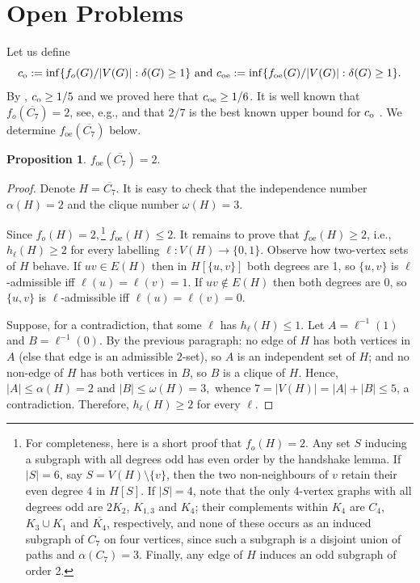 \documentclass[11pt]{article}
\newcommand{\GG}[1]{{#1}}
\newcommand{\VV}[1]{{#1}}
\newtheorem{proposition}[theorem]{Proposition}
\theoremstyle{definition}
\theoremstyle{remark}
\newcommand{\foe}{f_{\mathrm{oe}}}
\newcommand{\fo}{f_o}
\newcommand{\1}{\mathbf{1}}
\begin{document}
\section{Open Problems}
\GG{
Let us define
$$c_{\rm o}:=\inf\{\fo(G)/|V(G)|: \delta(G)\ge 1\} \mbox{ and } c_{\rm oe}:=\inf\{\foe(G)/|V(G)|: \delta(G)\ge 1\}.$$
By \cite{Zeng}, $c_{\rm o}\ge 1/5$ and we proved here that $c_{\rm oe}\ge 1/6$. 
It is well known that $\fo(\overline{C_7})=2$, see, e.g., \cite{Caro1994} and that $2/7$ is the best
known upper bound for $c_{\rm o}$ \cite{AiEtAl2026,Zeng}. We determine $\foe(\overline{C_7})$ below.
}
{
\begin{proposition}\label{prop:lower}
$\foe(\overline{C_7})=2.$
\end{proposition}
\begin{proof}
Denote $H=\overline{C_7}.$ It is easy to check that the independence number $\alpha(H)=2$ and the clique number $\omega(H)=3.$


Since $\fo(H)=2,$\footnote{\VV{For completeness, here is a short proof that $\fo(H)=2$. Any set $S$ inducing a subgraph with all degrees odd has even order by the handshake lemma. If $|S|=6$, say $S=V(H)\setminus\{v\}$, then the two non-neighbours of $v$ retain their even degree $4$ in $H[S]$. If $|S|=4$, note that the only $4$-vertex graphs with all degrees odd are $2K_2$, $K_{1,3}$ and $K_4$; their complements within $K_4$ are $C_4$, $K_3\cup K_1$ and $\overline{K_4}$, respectively, and none of these occurs as an induced subgraph of $C_7$ on four vertices, since such a subgraph is a disjoint union of paths and $\alpha(C_7)=3$. Finally, any edge of $H$ induces an odd subgraph of order 2.}} $\foe(H)\le 2.$
It remains to prove that $\foe(H)\ge 2$, i.e.,
$h_\ell(H)\ge 2$ for every labelling $\ell:V(H)\to\{0,1\}$.
Observe how two-vertex sets of $H$ behave. If $uv\in E(H)$ then in
$H[\{u,v\}]$ both degrees are 1, so $\{u,v\}$ is $\ell$-admissible
iff $\ell(u)=\ell(v)=1$. If $uv \not\in E(H)$ then both degrees are 0,
so $\{u,v\}$ is $\ell$-admissible iff $\ell(u)=\ell(v)=0$.


Suppose, for a contradiction, that some $\ell$ has $h_\ell(H)\le 1$.
Let $A=\ell^{-1}(1)$ and $B=\ell^{-1}(0)$. By the previous paragraph:
no edge of $H$ has both vertices in $A$ (else that edge is an
admissible $2$-set), so $A$ is an independent set of $H$; and no
non-edge of $H$ has both vertices in $B$, so $B$ is a clique of
$H$. Hence,
$
|A|\le\alpha(H)=2
\text{ and }
|B|\le\omega(H)=3,
$
whence $7=|V(H)|=|A|+|B|\le 5$, a contradiction. Therefore, 
$h_\ell(H)\ge2$ for every $\ell$.
\end{proof}
}
\end{document}
